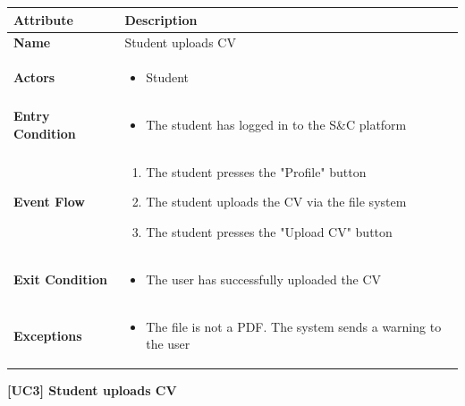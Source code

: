 \begin{center}
    
    \begin{tabular}{|p{3cm}|p{9cm}|}
    \hline
    \textbf{Attribute} & \textbf{Description} \\ \hline
    \textbf{Name} & Student uploads CV \\ \hline
    \textbf{Actors} & 
    \begin{itemize}
        \item Student
    \end{itemize} \\ \hline
    \textbf{Entry Condition} & 
    \begin{itemize}
        \item The student has logged in to the S\&C platform
    \end{itemize} \\ \hline
    \textbf{Event Flow} & 
    \begin{enumerate}
        \item The student presses the "Profile" button
        \item The student uploads the CV via the file system
        \item The student presses the "Upload CV" button
    \end{enumerate} \\ \hline
    \textbf{Exit Condition} & 
    \begin{itemize}
        \item The user has successfully uploaded the CV
    \end{itemize} \\ \hline
    \textbf{Exceptions} & 
    \begin{itemize}
        \item [4a.] The file is not a PDF. The system sends a warning to the user
    \end{itemize} \\ \hline
    \end{tabular}
    \newline
    \newline
    \textbf{[UC3] Student uploads CV}
    \newline
    \newline


\end{center}
